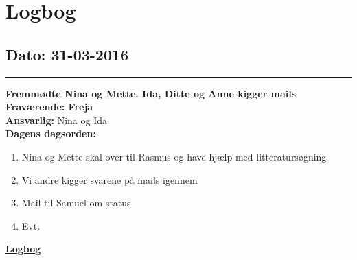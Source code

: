 \chapter{Logbog}
\section{Dato: 31-03-2016}
\hrule
\textbf{Fremmødte Nina og Mette. Ida, Ditte og Anne kigger mails} \\
\textbf{Fraværende: Freja } \\
\textbf{Ansvarlig:} Nina og Ida  \\
\textbf{Dagens dagsorden: }
\begin{enumerate}
	\item Nina og Mette skal over til Rasmus og have hjælp med litteratursøgning
	\item Vi andre kigger svarene på mails igennem
	\item Mail til Samuel om status 
	\item Evt. 
\end{enumerate}

\underline{\textbf{Logbog}}

\newpage